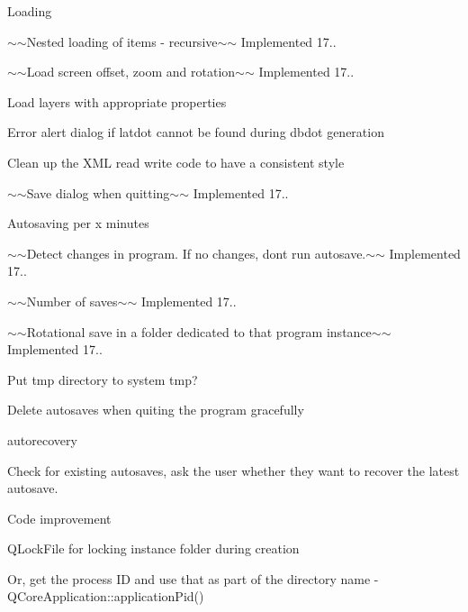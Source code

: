 \begin{DoxyItemize}
\begin{DoxyItemize}
\end{DoxyItemize}
\item Loading
\begin{DoxyItemize}
\item $\sim$$\sim$\+Nested loading of items -\/ recursive$\sim$$\sim$ Implemented 17..
\item $\sim$$\sim$\+Load screen offset, zoom and rotation$\sim$$\sim$ Implemented 17..
\item Load layers with appropriate properties
\item Error alert dialog if latdot cannot be found during dbdot generation
\item Clean up the X\+ML read write code to have a consistent style
\end{DoxyItemize}
\item $\sim$$\sim$\+Save dialog when quitting$\sim$$\sim$ Implemented 17..
\item Autosaving per x minutes
\begin{DoxyItemize}
\item $\sim$$\sim$\+Detect changes in program. If no changes, don\textquotesingle{}t run autosave.$\sim$$\sim$ Implemented 17..
\item $\sim$$\sim$\+Number of saves$\sim$$\sim$ Implemented 17..
\item $\sim$$\sim$\+Rotational save in a folder dedicated to that program instance$\sim$$\sim$ Implemented 17..
\item Put tmp directory to system tmp?
\item Delete autosaves when quiting the program gracefully
\end{DoxyItemize}
\item autorecovery
\begin{DoxyItemize}
\item Check for existing autosaves, ask the user whether they want to recover the latest autosave.
\end{DoxyItemize}
\item Code improvement
\begin{DoxyItemize}
\item Q\+Lock\+File for locking instance folder during creation
\begin{DoxyItemize}
\item Or, get the process ID and use that as part of the directory name -\/ Q\+Core\+Application\+::application\+Pid() 
\end{DoxyItemize}
\end{DoxyItemize}
\end{DoxyItemize}